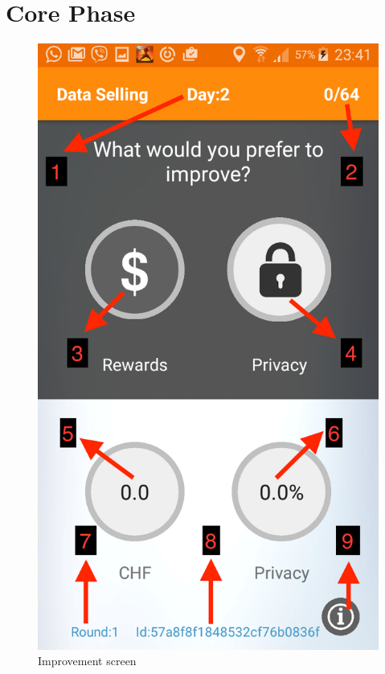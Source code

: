 \section{Core Phase} \label{core}

\begin{figure}[ht!]
\centering
\includegraphics[width=\textwidth,keepaspectratio]{./images/improve}
\caption{Improvement screen }
\label{fig:imp}
\end{figure}

